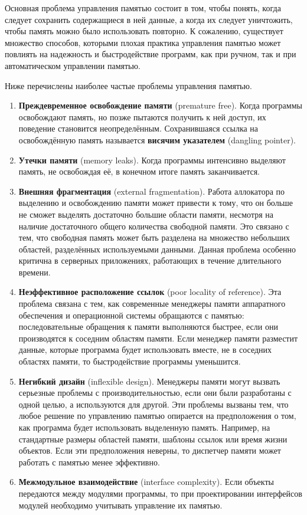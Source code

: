 Основная проблема управления памятью состоит в том, чтобы понять, когда следует сохранить содержащиеся в ней данные, а когда их следует уничтожить, чтобы память можно было использовать повторно. К сожалению, существует множество способов, которыми плохая практика управления памятью может повлиять на надежность и быстродействие программ, как при ручном, так и при автоматическом управлении памятью.

Ниже перечислены наиболее частые проблемы управления памятью. \cite{mm_overview}

\begin{enumerate}[label*=\arabic*.]
	\item \textbf{Преждевременное освобождение памяти} (premature free). 
	Когда программы освобождают память, но позже пытаются получить к ней доступ, их поведение становится неопределённым. Сохранившаяся ссылка на освобождённую память называется \textbf{висячим указателем} (dangling pointer).
	\item \textbf{Утечки памяти} (memory leaks). Когда программы интенсивно выделяют память, не освобождая её, в конечном итоге память заканчивается.
	\item \textbf{Внешняя фрагментация} (external fragmentation). Работа аллокатора по выделению и освобождению памяти может привести к тому, что он больше не сможет выделять достаточно большие области памяти, несмотря на наличие достаточного общего количества свободной памяти. Это связано с тем, что свободная память может быть разделена на множество небольших областей, разделённых используемыми данными. Данная проблема особенно критична в серверных приложениях, работающих в течение длительного времени.
	\item \textbf{Неэффективное расположение ссылок} (poor locality of reference). Эта проблема связана с тем, как современные менеджеры памяти аппаратного обеспечения и операционной системы обращаются с памятью: последовательные обращения к памяти выполняются быстрее, если они производятся к соседним областям памяти. Если менеджер памяти разместит данные, которые программа будет использовать вместе, не в соседних областях памяти, то быстродействие программы уменьшится.
	\item \textbf{Негибкий дизайн} (inflexible design). Менеджеры памяти могут вызвать серьезные проблемы с производительностью, если они были разработаны с одной целью, а используются для другой. Эти проблемы вызваны тем, что любое решение по управлению памятью опирается на предположения о том, как программа будет использовать выделенную память. Например, на стандартные размеры областей памяти, шаблоны ссылок или время жизни объектов. Если эти предположения неверны, то диспетчер памяти может работать с памятью менее эффективно.
	\item \textbf{Межмодульное взаимодействие} (interface complexity). Если объекты передаются между модулями программы, то при проектировании интерфейсов модулей необходимо учитывать управление их памятью.
\end{enumerate}

